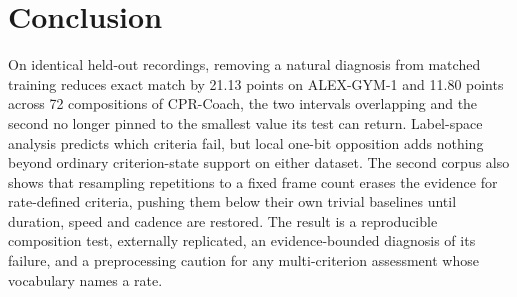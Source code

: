 \documentclass[conference,a4paper]{IEEEtran}
\begin{document}
\section{Conclusion}
On identical held-out recordings, removing a natural diagnosis from matched
training reduces exact match by 21.13 points on ALEX-GYM-1 and 11.80 points
across 72 compositions of CPR-Coach, the two intervals overlapping and the
second no longer pinned to the smallest value its test can return. Label-space
analysis predicts which criteria fail, but local one-bit opposition adds nothing
beyond ordinary criterion-state support on either dataset. The second corpus
also shows that resampling repetitions to a fixed frame count erases the
evidence for rate-defined criteria, pushing them below their own trivial
baselines until duration, speed and cadence are restored. The result is a
reproducible composition test, externally replicated, an evidence-bounded
diagnosis of its failure, and a preprocessing caution for any multi-criterion
assessment whose vocabulary names a rate.
\end{document}
